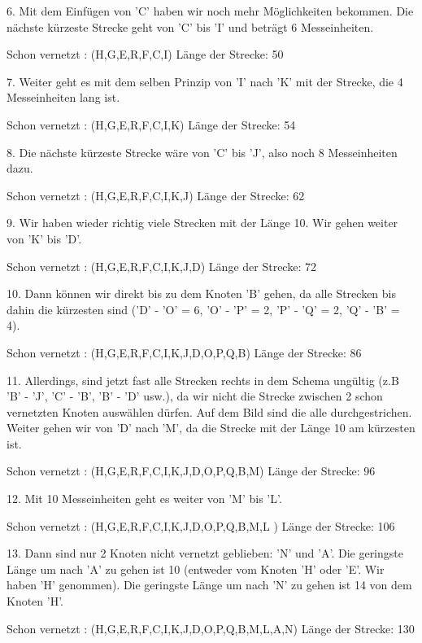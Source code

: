 \documentclass{pi2}
\begin{document}
	6. Mit dem Einfügen von 'C' haben wir noch mehr Möglichkeiten bekommen. Die nächste kürzeste Strecke geht von 'C' bis 'I' und beträgt 6 Messeinheiten. 
	
	Schon vernetzt : (H,G,E,R,F,C,I)
	Länge der Strecke: 50
	
	7. Weiter geht es mit dem selben Prinzip von 'I' nach 'K' mit der Strecke, die 4 Messeinheiten lang ist.
	
	Schon vernetzt : (H,G,E,R,F,C,I,K)
	Länge der Strecke: 54
	
	8. Die nächste kürzeste Strecke wäre von 'C' bis 'J', also noch 8 Messeinheiten dazu. 
	
	Schon vernetzt : (H,G,E,R,F,C,I,K,J)
	Länge der Strecke: 62
	
	9. Wir haben wieder richtig viele Strecken mit der Länge 10. Wir gehen weiter von 'K' bis 'D'.
	
	Schon vernetzt : (H,G,E,R,F,C,I,K,J,D)
	Länge der Strecke: 72
	
	10. Dann können wir direkt bis zu dem Knoten 'B' gehen, da alle Strecken bis dahin die kürzesten sind ('D' - 'O' = 6, 'O' - 'P' = 2, 'P' - 'Q' = 2, 'Q' - 'B' = 4).
	
	Schon vernetzt : (H,G,E,R,F,C,I,K,J,D,O,P,Q,B)
	Länge der Strecke: 86
	
	11. Allerdings, sind jetzt fast alle Strecken rechts in dem Schema ungültig (z.B 'B' - 'J', 'C' - 'B', 'B' - 'D' usw.), da wir nicht die Strecke zwischen 2 schon vernetzten Knoten auswählen dürfen. Auf dem Bild sind die alle durchgestrichen. Weiter gehen wir von 'D' nach 'M', da die Strecke mit der Länge 10 am kürzesten ist. 
	
	Schon vernetzt : (H,G,E,R,F,C,I,K,J,D,O,P,Q,B,M)
	Länge der Strecke: 96
	
	12. Mit 10 Messeinheiten geht es weiter von 'M' bis 'L'.
	
	Schon vernetzt : (H,G,E,R,F,C,I,K,J,D,O,P,Q,B,M,L
	)
	Länge der Strecke: 106
	
	13. Dann sind nur 2 Knoten nicht vernetzt geblieben: 'N' und 'A'. Die geringste Länge um nach 'A' zu gehen ist 10 (entweder vom Knoten 'H' oder 'E'. Wir haben 'H' genommen). Die geringste Länge um nach 'N' zu gehen ist 14 von dem Knoten 'H'.
	
	Schon vernetzt : (H,G,E,R,F,C,I,K,J,D,O,P,Q,B,M,L,A,N)
	Länge der Strecke: 130
\end{document}
